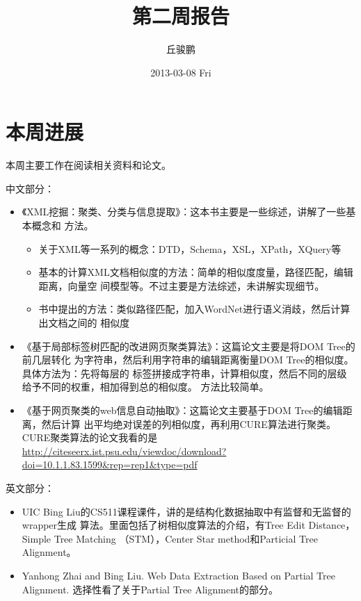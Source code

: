 \documentclass[a4paper]{article}
\title{第二周报告}
\author{丘骏鹏}
\date{2013-03-08 Fri}
\begin{document}
\maketitle

\setcounter{tocdepth}{3}
\tableofcontents
\vspace*{1cm}

\section{本周进展}
\label{sec-1}

本周主要工作在阅读相关资料和论文。

中文部分：
\begin{itemize}
\item 《XML挖掘：聚类、分类与信息提取》：这本书主要是一些综述，讲解了一些基本概念和
  方法。
\begin{itemize}
\item 关于XML等一系列的概念：DTD，Schema，XSL，XPath，XQuery等
\item 基本的计算XML文档相似度的方法：简单的相似度度量，路径匹配，编辑距离，向量空
    间模型等。不过主要是方法综述，未讲解实现细节。
\item 书中提出的方法：类似路径匹配，加入WordNet进行语义消歧，然后计算出文档之间的
    相似度
\end{itemize}
\item 《基于局部标签树匹配的改进网页聚类算法》：这篇论文主要是将DOM Tree的前几层转化
  为字符串，然后利用字符串的编辑距离衡量DOM Tree的相似度。具体方法为：先将每层的
  标签拼接成字符串，计算相似度，然后不同的层级给予不同的权重，相加得到总的相似度。
  方法比较简单。
\item 《基于网页聚类的web信息自动抽取》：这篇论文主要基于DOM Tree的编辑距离，然后计算
  出平均绝对误差的列相似度，再利用CURE算法进行聚类。CURE聚类算法的论文我看的是
  \href{http://citeseerx.ist.psu.edu/viewdoc/download?doi=10.1.1.83.1599&rep=rep1&type=pdf}{http://citeseerx.ist.psu.edu/viewdoc/download?doi=10.1.1.83.1599\&rep=rep1\&type=pdf}
\end{itemize}

英文部分：
\begin{itemize}
\item UIC Bing Liu的CS511课程课件，讲的是结构化数据抽取中有监督和无监督的wrapper生成
  算法。里面包括了树相似度算法的介绍，有Tree Edit Distance，Simple Tree Matching
  （STM），Center Star method和Particial Tree Alignment。
\item Yanhong Zhai and Bing Liu. Web Data Extraction Based on Partial Tree
  Alignment. 选择性看了关于Partial Tree Alignment的部分。
\end{itemize}
\end{document}
